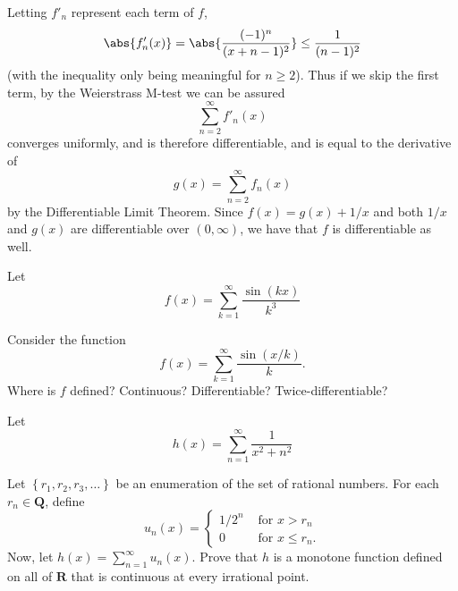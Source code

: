 Letting \(f'_n\) represent each term of \(f\),
\[\abs{f'_n(x)} = \abs{\frac{(-1)^{n}}{(x+n - 1)^2}} \leq \frac{1}{(n-1)^2}\]
(with the inequality only being meaningful for \(n \geq 2\)). Thus if we skip the first term, by the Weierstrass M-test we can be assured
\[\sum^\infty_{n=2}f'_n(x)\]
converges uniformly, and is therefore differentiable, and is equal to the derivative of
\[g(x) = \sum^\infty_{n=2}f_n(x)\]
by the Differentiable Limit Theorem. Since \(f(x) = g(x) + 1/x\) and both \(1/x\) and \(g(x)\) are differentiable over \((0, \infty)\), we have that \(f\) is differentiable as well.
\begin{exercise}
  Let
  $$
  f(x)=\sum_{k=1}^{\infty} \frac{\sin (k x)}{k^{3}}
  $$
\end{exercise}
\begin{solution}
  \TODO
\end{solution}
\begin{exercise}
  Consider the function
  $$
  f(x)=\sum_{k=1}^{\infty} \frac{\sin (x / k)}{k} .
  $$
  Where is $f$ defined? Continuous? Differentiable? Twice-differentiable?
\end{exercise}
\begin{solution}
  \TODO
\end{solution}
\begin{exercise}
  Let
  $$
  h(x)=\sum_{n=1}^{\infty} \frac{1}{x^{2}+n^{2}}
  $$
\end{exercise}
\begin{solution}
  \TODO
\end{solution}
\begin{exercise}
  Let $\left\{r_{1}, r_{2}, r_{3}, \ldots\right\}$ be an enumeration of the set of rational numbers. For each $r_{n} \in \mathbf{Q}$, define
  $$
  u_{n}(x)= \begin{cases}1 / 2^{n} & \text { for } x>r_{n} \\ 0 & \text { for } x \leq r_{n} .\end{cases}
  $$
  Now, let $h(x)=\sum_{n=1}^{\infty} u_{n}(x)$. Prove that $h$ is a monotone function defined on all of $\mathbf{R}$ that is continuous at every irrational point.
\end{exercise}
\begin{solution}
  \TODO
\end{solution}
